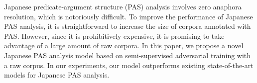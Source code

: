 Japanese predicate-argument structure (PAS) analysis involves zero anaphora resolution, which is notoriously difficult. To improve the performance of Japanese PAS analysis, it is straightforward to increase the size of corpora annotated with PAS. However, since it is prohibitively expensive, it is promising to take advantage of a large amount of raw corpora. In this paper, we propose a novel Japanese PAS analysis model based on semi-supervised adversarial training with a raw corpus. In our experiments, our model outperforms existing state-of-the-art models for Japanese PAS analysis.
